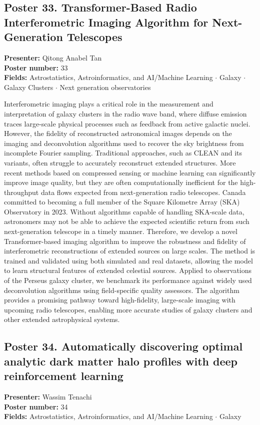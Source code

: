 \subsection*{Poster 33. Transformer-Based Radio Interferometric Imaging Algorithm for Next-Generation Telescopes}
\textbf{Presenter:} Qitong Anabel Tan\\
\textbf{Poster number:} 33\\
\textbf{Fields:} Astrostatistics, Astroinformatics, and AI/Machine Learning $\cdot$ Galaxy $\cdot$ Galaxy Clusters $\cdot$ Next generation observatories

Interferometric imaging plays a critical role in the measurement and interpretation of galaxy clusters in the radio wave band, where diffuse emission traces large-scale physical processes such as feedback from active galactic nuclei. However, the fidelity of reconstructed astronomical images depends on the imaging and deconvolution algorithms used to recover the sky brightness from incomplete Fourier sampling. Traditional approaches, such as CLEAN and its variants, often struggle to accurately reconstruct extended structures. More recent methods based on compressed sensing or machine learning can significantly improve image quality, but they are often computationally inefficient for the high-throughput data flows expected from next-generation radio telescopes. Canada committed to becoming a full member of the Square Kilometre Array (SKA) Observatory in 2023. Without algorithms capable of handling SKA-scale data, astronomers may not be able to achieve the expected scientific return from such next-generation telescope in a timely manner. Therefore, we develop a novel Transformer-based imaging algorithm to improve the robustness and fidelity of interferometric reconstructions of extended sources on large scales. The method is trained and validated using both simulated and real datasets, allowing the model to learn structural features of extended celestial sources. Applied to observations of the Perseus galaxy cluster, we benchmark its performance against widely used deconvolution algorithms using field-specific quality assessors. The algorithm provides a promising pathway toward high-fidelity, large-scale imaging with upcoming radio telescopes, enabling more accurate studies of galaxy clusters and other extended astrophysical systems.

\hypertarget{poster-abstract-talk-275}{}\label{poster-abstract-page-talk-275}
\subsection*{Poster 34. Automatically discovering optimal analytic dark matter halo profiles with deep reinforcement learning}
\textbf{Presenter:} Wassim Tenachi\\
\textbf{Poster number:} 34\\
\textbf{Fields:} Astrostatistics, Astroinformatics, and AI/Machine Learning $\cdot$ Galaxy

